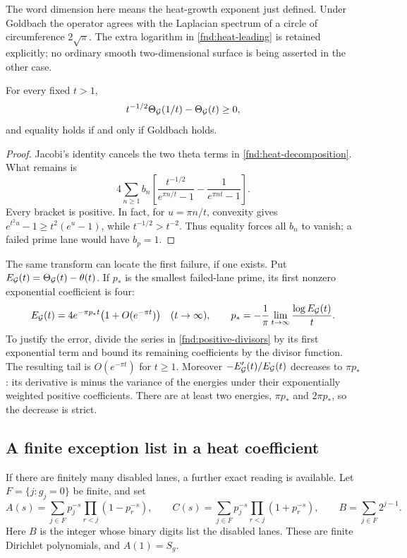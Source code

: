 The word dimension here means the heat-growth exponent just defined.
Under Goldbach the operator agrees with the Laplacian spectrum of a
circle of circumference $2\sqrt\pi$.  The extra logarithm in
\eqref{fnd:heat-leading} is retained explicitly; no ordinary smooth
two-dimensional surface is being asserted in the other case.

\begin{proposition}\label{fnd:inversion}
For every fixed $t>1$,
\[
 t^{-1/2}\Theta_{\mathcal G}(1/t)-\Theta_{\mathcal G}(t)\ge0,
\]
and equality holds if and only if Goldbach holds.
\end{proposition}
\begin{proof}
Jacobi's identity cancels the two theta terms in
\eqref{fnd:heat-decomposition}.  What remains is
\[
 4\sum_{n\ge1}b_n\left[
 \frac{t^{-1/2}}{e^{\pi n/t}-1}
 -\frac1{e^{\pi nt}-1}\right].
\]
Every bracket is positive.  In fact, for $u=\pi n/t$,
convexity gives $e^{t^2u}-1\ge t^2(e^u-1)$, while
$t^{-1/2}>t^{-2}$.  Thus equality forces all $b_n$ to vanish;
a failed prime lane would have $b_p=1$.
\end{proof}

The same transform can locate the first failure, if one exists.
Put $E_{\mathcal G}(t)=\Theta_{\mathcal G}(t)-\theta(t)$.  If $p_*$ is the smallest
failed-lane prime, its first nonzero exponential coefficient is four:
\begin{equation}
 E_{\mathcal G}(t)=4e^{-\pi p_*t}\bigl(1+O(e^{-\pi t})\bigr)
 \quad(t\to\infty),\qquad
 p_*=-\frac1\pi\lim_{t\to\infty}\frac{\log E_{\mathcal G}(t)}t.
 \label{fnd:first-heat-failure}
\end{equation}
To justify the error, divide the series in
\eqref{fnd:positive-divisors} by its first exponential term and
bound its remaining coefficients by the divisor function.  The
resulting tail is $O(e^{-\pi t})$ for $t\ge1$.
Moreover $-E_{\mathcal G}'(t)/E_{\mathcal G}(t)$ decreases to $\pi p_*$: its derivative
is minus the variance of the energies under their exponentially
weighted positive coefficients.  There are at least two energies,
$\pi p_*$ and $2\pi p_*$, so the decrease is strict.

\subsection{A finite exception list in a heat coefficient}

If there are finitely many disabled lanes, a further exact reading
is available.  Let $F=\{j:g_j=0\}$ be finite, and set
\[
 A(s)=\sum_{j\in F}p_j^{-s}\prod_{r<j}(1-p_r^{-s}),\qquad
 C(s)=\sum_{j\in F}p_j^{-s}\prod_{r<j}(1+p_r^{-s}),\qquad
 B=\sum_{j\in F}2^{j-1}.
\]
Here $B$ is the integer whose binary digits list the disabled lanes.
These are finite Dirichlet polynomials, and $A(1)=S_g$.


